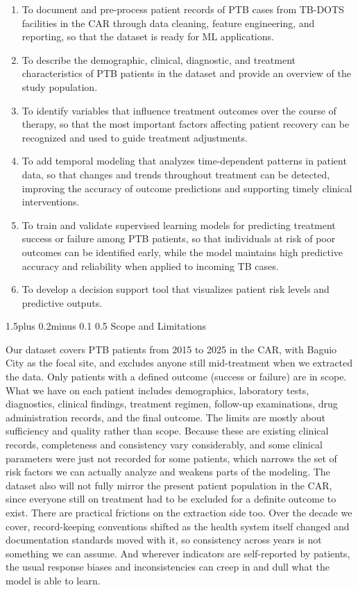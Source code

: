 \documentclass[12pt]{article}
\makeatletter
\renewcommand{\_}{\textunderscore\allowbreak}
\renewcommand{\subsection}{\@startsection{subsection}{2}{0pt}%
  {1.5\baselineskip plus 0.2\baselineskip minus 0.1\baselineskip}%
  {0.5\baselineskip}%
  {\bfseries\normalsize}}
\makeatother
\begin{document}
\begin{enumerate}
    \item To document and pre-process patient records of PTB cases from TB-DOTS facilities in the CAR through data cleaning, feature engineering, and reporting, so that the dataset is ready for ML applications.
    \item To describe the demographic, clinical, diagnostic, and treatment characteristics of PTB patients in the dataset and provide an overview of the study population.
    \item To identify variables that influence treatment outcomes over the course of therapy, so that the most important factors affecting patient recovery can be recognized and used to guide treatment adjustments.
    \item To add temporal modeling that analyzes time-dependent patterns in patient data, so that changes and trends throughout treatment can be detected, improving the accuracy of outcome predictions and supporting timely clinical interventions.
    \item To train and validate supervised learning models for predicting treatment success or failure among PTB patients, so that individuals at risk of poor outcomes can be identified early, while the model maintains high predictive accuracy and reliability when applied to incoming TB cases.
    \item To develop a decision support tool that visualizes patient risk levels and predictive outputs.
\end{enumerate}

\subsection{Scope and Limitations}

Our dataset covers PTB patients from 2015 to 2025 in the CAR, with Baguio City as the focal site, and excludes anyone still mid-treatment when we extracted the data. Only patients with a defined outcome (success or failure) are in scope. What we have on each patient includes demographics, laboratory tests, diagnostics, clinical findings, treatment regimen, follow-up examinations, drug administration records, and the final outcome. The limits are mostly about sufficiency and quality rather than scope. Because these are existing clinical records, completeness and consistency vary considerably, and some clinical parameters were just not recorded for some patients, which narrows the set of risk factors we can actually analyze and weakens parts of the modeling. The dataset also will not fully mirror the present patient population in the CAR, since everyone still on treatment had to be excluded for a definite outcome to exist. There are practical frictions on the extraction side too. Over the decade we cover, record-keeping conventions shifted as the health system itself changed and documentation standards moved with it, so consistency across years is not something we can assume. And wherever indicators are self-reported by patients, the usual response biases and inconsistencies can creep in and dull what the model is able to learn.
\end{document}
